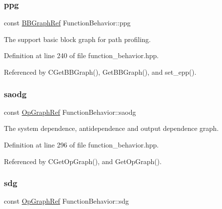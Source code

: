 \subsubsection{\texorpdfstring{ppg}{ppg}}
{\footnotesize\ttfamily const \hyperlink{basic__block_8hpp_a0e7f233d1b83cad0bfd5aa865f0d3532}{B\+B\+Graph\+Ref} Function\+Behavior\+::ppg\hspace{0.3cm}{\ttfamily [private]}}



The support basic block graph for path profiling. 



Definition at line 240 of file function\+\_\+behavior.\+hpp.



Referenced by C\+Get\+B\+B\+Graph(), Get\+B\+B\+Graph(), and set\+\_\+epp().

\mbox{\label{classFunctionBehavior_afe08fc227e99bce22580fc82d89fd6af}} 
\subsubsection{\texorpdfstring{saodg}{saodg}}
{\footnotesize\ttfamily const \hyperlink{op__graph_8hpp_aee97c95c40f791b60c451d9e29c72d39}{Op\+Graph\+Ref} Function\+Behavior\+::saodg\hspace{0.3cm}{\ttfamily [private]}}



The system dependence, antidependence and output dependence graph. 



Definition at line 296 of file function\+\_\+behavior.\+hpp.



Referenced by C\+Get\+Op\+Graph(), and Get\+Op\+Graph().

\mbox{\label{classFunctionBehavior_ac63d33524ffbc4d8eacf94a854785232}} 
\subsubsection{\texorpdfstring{sdg}{sdg}}
{\footnotesize\ttfamily const \hyperlink{op__graph_8hpp_aee97c95c40f791b60c451d9e29c72d39}{Op\+Graph\+Ref} Function\+Behavior\+::sdg\hspace{0.3cm}{\ttfamily [private]}}



